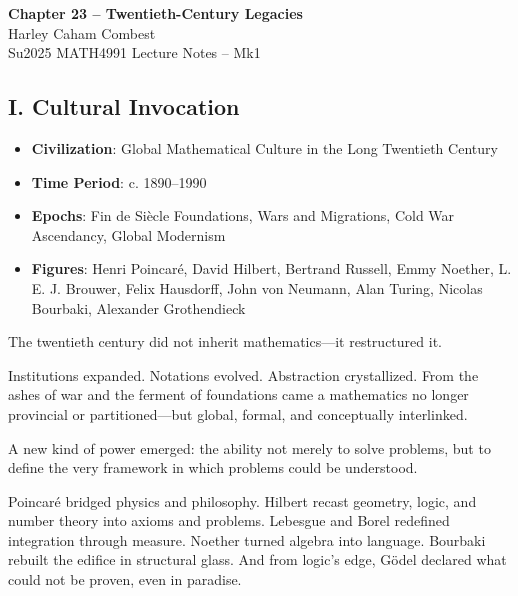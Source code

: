 \documentclass[9pt]{article}
\begin{document}
\begin{center}
\Large\textbf{Chapter 23 – Twentieth-Century Legacies} \\
\large Harley Caham Combest \\
\large Su2025 MATH4991 Lecture Notes – Mk1
\end{center}

\vspace{1em}

\subsection*{I. Cultural Invocation}

\begin{itemize}
  \item \textbf{Civilization}: Global Mathematical Culture in the Long Twentieth Century
  \item \textbf{Time Period}: c. 1890--1990
  \item \textbf{Epochs}: Fin de Siècle Foundations, Wars and Migrations, Cold War Ascendancy, Global Modernism
  \item \textbf{Figures}: Henri Poincaré, David Hilbert, Bertrand Russell, Emmy Noether, L. E. J. Brouwer, Felix Hausdorff, John von Neumann, Alan Turing, Nicolas Bourbaki, Alexander Grothendieck
\end{itemize}

\noindent
The twentieth century did not inherit mathematics—it restructured it.

\medskip

\noindent
Institutions expanded. Notations evolved. Abstraction crystallized. From the ashes of war and the ferment of foundations came a mathematics no longer provincial or partitioned—but global, formal, and conceptually interlinked.

\medskip

\noindent
A new kind of power emerged: the ability not merely to solve problems, but to define the very framework in which problems could be understood.

\medskip

\noindent
Poincaré bridged physics and philosophy. Hilbert recast geometry, logic, and number theory into axioms and problems. Lebesgue and Borel redefined integration through measure. Noether turned algebra into language. Bourbaki rebuilt the edifice in structural glass. And from logic's edge, Gödel declared what could not be proven, even in paradise.

\medskip
\end{document}
